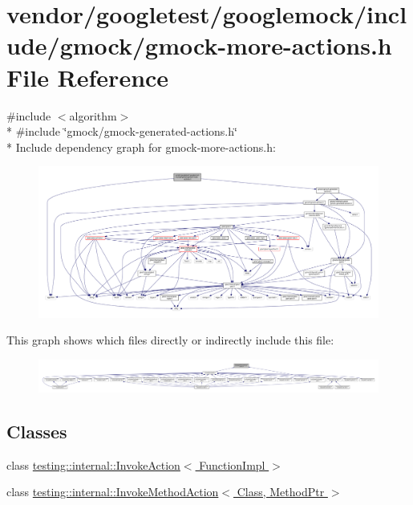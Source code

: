\hypertarget{gmock-more-actions_8h}{}\section{vendor/googletest/googlemock/include/gmock/gmock-\/more-\/actions.h File Reference}
\label{gmock-more-actions_8h}
{\ttfamily \#include $<$algorithm$>$}\\*
{\ttfamily \#include \char`\"{}gmock/gmock-\/generated-\/actions.\+h\char`\"{}}\\*
Include dependency graph for gmock-\/more-\/actions.h\+:
\nopagebreak
\begin{figure}[H]
\begin{center}
\leavevmode
\includegraphics[width=350pt]{gmock-more-actions_8h__incl}
\end{center}
\end{figure}
This graph shows which files directly or indirectly include this file\+:
\nopagebreak
\begin{figure}[H]
\begin{center}
\leavevmode
\includegraphics[width=350pt]{gmock-more-actions_8h__dep__incl}
\end{center}
\end{figure}
\subsection*{Classes}
\begin{DoxyCompactItemize}
\item 
class \hyperlink{classtesting_1_1internal_1_1InvokeAction}{testing\+::internal\+::\+Invoke\+Action$<$ Function\+Impl $>$}
\item 
class \hyperlink{classtesting_1_1internal_1_1InvokeMethodAction}{testing\+::internal\+::\+Invoke\+Method\+Action$<$ Class, Method\+Ptr $>$}
\end{DoxyCompactItemize}
